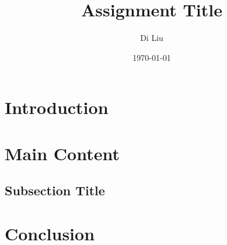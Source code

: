 \documentclass[12pt]{article}
\title{Assignment Title}
\author{Di Liu}
\date{\today}
\begin{document}
\maketitle

\section{Introduction}

\section{Main Content}
\subsection{Subsection Title}

\section{Conclusion}

%
%
\end{document}
